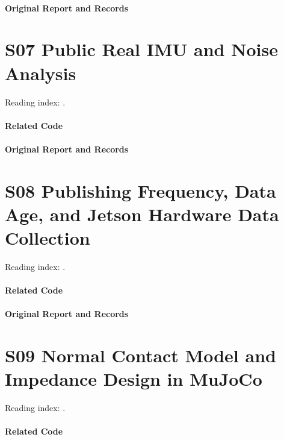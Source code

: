 \paragraph{Original Report and Records}
\noindent{}\par
\section*{S07 Public Real IMU and Noise Analysis}
\hypertarget{code-s07}{}
Reading index: .
\paragraph{Related Code}
\noindent{}\par
\paragraph{Original Report and Records}
\noindent{}\par
\section*{S08 Publishing Frequency, Data Age, and Jetson Hardware Data Collection}
\hypertarget{code-s08}{}
Reading index: .
\paragraph{Related Code}
\noindent{}\par
\paragraph{Original Report and Records}
\noindent{}\par
\section*{S09 Normal Contact Model and Impedance Design in MuJoCo}
\hypertarget{code-s09}{}
Reading index: .
\paragraph{Related Code}
\noindent{}\par
